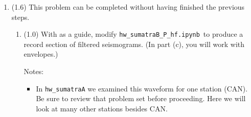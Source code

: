 \documentclass[11pt,titlepage,fleqn]{article}
\newcommand{\tfilehf}{{\tt hw\_sumatraB\_P\_hf.ipynb}}
\begin{document}
\begin{enumerate}
%
\begin{enumerate}
\item (0.1) What is the actual rupture time?
\item (0.1) What $\alpha$ will produce a $T_r$ that is the actual rupture time?
\item (0.1) What $\alpha$ will produce a minimum $T_r(\alpha)$, $T_{\rm min}$?
\item (0.1) What $\alpha$ will produce a maximum $T_r(\alpha)$, $T_{\rm max}$?
\item (0.2) The range of $T_r$ is given by $T_{\rm max} - T_{\rm min}$. \\
What is the range, considering variations in $\alpha$ only?
\item (0.1) What is $\overline{T}_r$, the azimuthal average of $T_r$? \\
Hint: Integration is needed.
\item (0.4) Show that, with our assumptions,  can be written in terms of only $T_{\rm min}$, $T_{\rm max}$, $\alpha$, and $\alpha_0$.

Hint:  is an equation with 6 unknowns: $T_r$, $L$, $v_r$, $v$, $\alpha$, $\alpha_0$. Your equations for $T_{\rm min}$ and $T_{\rm max}$ give you two additional equations with two additional unknowns ($T_{\rm min}$, $T_{\rm max}$). You are asked to write an equation with 5 unknowns (including $T_r$). Therefore you start with a system of 3 equations with 8 unknowns, and you can reduce this to 1 equation with 5 unknowns. This is algebra, so no numbers should appear anywhere.

\end{enumerate}


\item (1.6) This problem can be completed without having finished the previous steps.
\begin{enumerate}
\item (1.0) With \citet[][Figure~1d]{Ni2005} as a guide, modify \tfilehf\ to produce a record section of filtered seismograms. (In part (c), you will work with envelopes.)

Notes:
%
\begin{itemize}
\item In \verb+hw_sumatraA+ we examined this waveform for one station (CAN). Be sure to review that problem set before proceeding. Here we will look at many other stations besides CAN.


\end{itemize}
\end{enumerate}
\end{enumerate}
\end{document}
